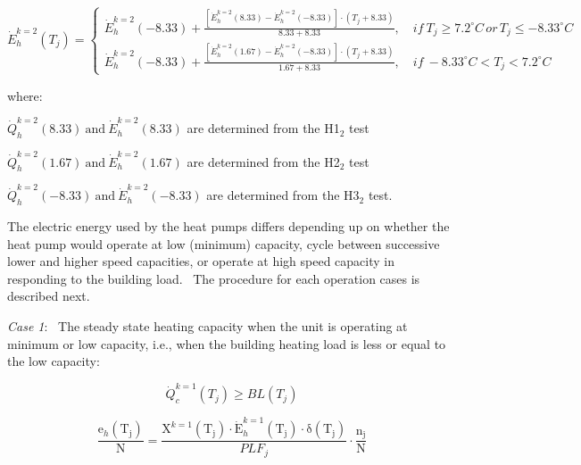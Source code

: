 \begin{equation}
\dot E_h^{k = 2}({T_j}) = \left\{ \begin{array}{l}\dot E_h^{k = 2}( - 8.33) + \frac{{\left[ {\dot E_h^{k = 2}(8.33) - \dot E_h^{k = 2}( - 8.33)} \right] \cdot \left( {{T_j} + 8.33} \right)}}{{8.33 + 8.33}},\quad if~{T_j} \ge 7.2^\circ C\,or\,{T_j} \le  - 8.33^\circ C\\\dot E_h^{k = 2}( - 8.33) + \frac{{\left[ {\dot E_h^{k = 2}(1.67) - \dot E_h^{k = 2}( - 8.33)} \right] \cdot \left( {{T_j} + 8.33} \right)}}{{1.67 + 8.33}},\quad if~ - 8.33^\circ C < {T_j} < 7.2^\circ C\end{array} \right.
\end{equation}

where:

\(\dot Q_h^{k = 2}\left( {{\mathrm{8}}{\mathrm{.33}}} \right) {\mathrm{~and~}} \dot E_h^{k = 2}\left( {{\mathrm{8}}{\mathrm{.33}}} \right)\) are determined from the H1\(_{2}\) test

\(\dot Q_h^{k = 2}\left( {{\mathrm{1}}{\mathrm{.67}}} \right) {\mathrm{~and~}} \dot E_h^{k = 2}\left( {{\mathrm{1}}{\mathrm{.67}}} \right)\) are determined from the H2\(_{2}\) test

\(\dot Q_h^{k = 2}\left( {{\mathrm{ - 8}}{\mathrm{.33}}} \right) {\mathrm{~and~}} \dot E_h^{k = 2}\left( {{\mathrm{ - 8}}{\mathrm{.33}}} \right)\) are determined from the H3\(_{2}\) test.

The electric energy used by the heat pumps differs depending up on whether the heat pump would operate at low (minimum) capacity, cycle between successive lower and higher speed capacities, or operate at high speed capacity in responding to the building load.~ The procedure for each operation cases is described next.

\emph{Case 1}:~ The steady state heating capacity when the unit is operating at minimum or low capacity, i.e., when the building heating load is less or equal to the low capacity:

\begin{equation}
\dot Q_c^{k = 1}\left( {{T_j}} \right) \ge BL\left( {{T_j}} \right)
\end{equation}

\begin{equation}
\frac{{{{\mathrm{e}}_h}\left( {{{\mathrm{T}}_{\mathrm{j}}}} \right)}}{{\mathrm{N}}}{\mathrm{ = }}\frac{{{{\mathrm{X}}^{k = 1}}\left( {{{\mathrm{T}}_{\mathrm{j}}}} \right) \cdot {\mathrm{\dot E}}_h^{k = 1}\left( {{{\mathrm{T}}_{\mathrm{j}}}} \right) \cdot {\mathrm{\delta }}\left( {{{\mathrm{T}}_{\mathrm{j}}}} \right)}}{{PL{F_j}}} \cdot \frac{{{{\mathrm{n}}_{\mathrm{j}}}}}{{\mathrm{N}}}
\end{equation}

